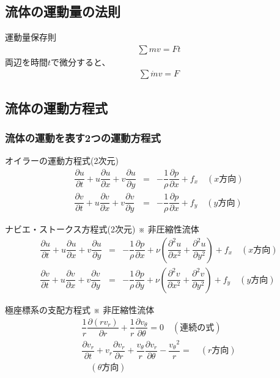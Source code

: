\documentclass[a4paper]{jsarticle}
\begin{document}
\subsection{流体の運動量の法則}
\begin{itembox}[l]{運動量保存則}
    \begin{eqnarray*}
        \displaystyle\sum mv=Ft
    \end{eqnarray*}
    両辺を時間$t$で微分すると、
    \begin{eqnarray*}
        \displaystyle\sum \dot{m}v=F
    \end{eqnarray*}
\end{itembox}
\subsection{流体の運動方程式}
\subsubsection{流体の運動を表す2つの運動方程式}
\begin{itembox}[l]{オイラーの運動方程式(2次元)}
    \begin{eqnarray*}
        \dfrac{\partial u}{\partial t}+u\dfrac{\partial u}{\partial x}+v\dfrac{\partial u}{\partial y}&=&-\dfrac{1}{\rho}\dfrac{\partial p}{\partial x}+f_x\quad(x方向)\\
        \dfrac{\partial v}{\partial t}+u\dfrac{\partial v}{\partial x}+v\dfrac{\partial v}{\partial y}&=&-\dfrac{1}{\rho}\dfrac{\partial p}{\partial x}+f_y\quad(y方向)
    \end{eqnarray*}
\end{itembox}
\begin{itembox}[l]{ナビエ・ストークス方程式(2次元)}
    ※ 非圧縮性流体
    \begin{eqnarray*}
        \dfrac{\partial u}{\partial t}+u\dfrac{\partial u}{\partial x}+v\dfrac{\partial u}{\partial y}&=&-\dfrac{1}{\rho}\dfrac{\partial p}{\partial x}+\nu\left(\dfrac{\partial^2 u}{\partial x^2}+\dfrac{\partial^2 u}{\partial y^2}\right)+f_x\quad(x方向)\\
        \dfrac{\partial v}{\partial t}+u\dfrac{\partial v}{\partial x}+v\dfrac{\partial v}{\partial y}&=&-\dfrac{1}{\rho}\dfrac{\partial p}{\partial y}+\nu\left(\dfrac{\partial^2 v}{\partial x^2}+\dfrac{\partial^2 v}{\partial y^2}\right)+f_y\quad(y方向)
    \end{eqnarray*}
\end{itembox}
\begin{itembox}[l]{極座標系の支配方程式}
    ※ 非圧縮性流体
    \begin{eqnarray*}
        \dfrac{1}{r}\dfrac{\partial \left(rv_r\right)}{\partial r}+\dfrac{1}{r}\dfrac{\partial v_\theta}{\partial \theta}=0\quad(連続の式)\\
        \dfrac{\partial v_r}{\partial t}+v_r\dfrac{\partial v_r}{\partial r}+\dfrac{v_\theta}{r}\dfrac{\partial v_r}{\partial \theta}-\dfrac{{v_\theta}^2}{r}=\quad(r方向)\\
        \quad(\theta 方向)
    \end{eqnarray*}
\end{itembox}
\end{document}
